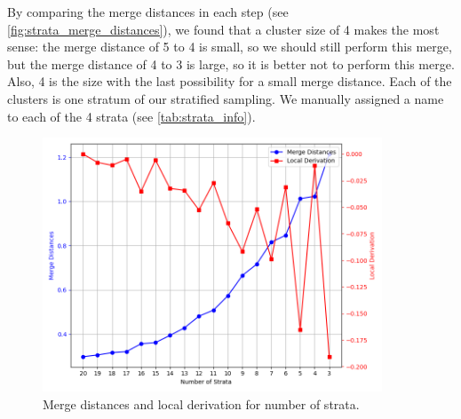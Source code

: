 \documentclass[%
class=scrreprt,
chapterprefix=false,%
open=right,%
twoside=false,%
paper=a4,%
logofile={Logo\_zentral\_farbig\_EN.png},%
thesistype=master,%
UKenglish,%
]{se2thesis}
\theoremstyle{definition}
\begin{document}
	By comparing the merge distances in each step (see \autoref{fig:strata_merge_distances}), we found that a cluster size of 4 makes the most sense: the merge distance of 5 to 4 is small, so we should still perform this merge, but the merge distance of 4 to 3 is large, so it is better not to perform this merge. Also, 4 is the size with the last possibility for a small merge distance. Each of the clusters is one stratum of our stratified sampling. We manually assigned a name to each of the 4 strata (see \autoref{tab:strata_info}).
	
	\begin{figure}[tb]
		\centering
		\includegraphics[width=0.9\textwidth]{img/strata_merge_distances.png}
		\caption{Merge distances and local derivation for number of strata.} 
		\label{fig:strata_merge_distances}
	\end{figure}
	
		
\end{document}
